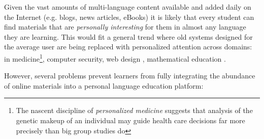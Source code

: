 

Given the vast amounts of multi-language content available and added daily on the Internet (e.g. blogs, news articles, eBooks) it is likely that every student can find materials that are {\em personally interesting} for them in almost any language they are learning. 
This would fit a general trend where old systems designed for the average user are being replaced with personalized attention across domains: in medicine\footnote{The nascent discipline of {\em personalized medicine} suggests that analysis of the genetic makeup of an individual may guide health care decisions far more precisely than big group studies do}, computer security,  web design \cite{Reinecke13-CulturalAdaptation}, mathematical education \cite{Polozov15-AdaptableMath}. 
% 
% 
% 
% 
% 
% 
% 

However, several problems prevent learners from fully integrating the abundance of online materials into a personal language education platform:

